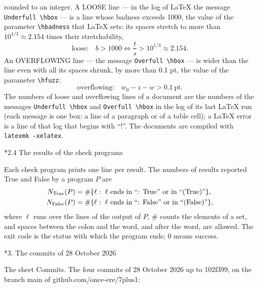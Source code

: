 \documentclass[10pt,a4paper]{article}
\makeatletter
\renewcommand\section{\@startsection{section}{1}{\z@}{-3.5ex \@plus -1ex \@minus -.2ex}{2.3ex \@plus.2ex}{\normalfont\Large\bfseries\raggedright}}
\renewcommand\subsection{\@startsection{subsection}{2}{\z@}{-3.25ex\@plus -1ex \@minus -.2ex}{1.5ex \@plus .2ex}{\normalfont\large\bfseries\raggedright}}
\makeatother
\begin{document}
rounded to an integer. A LOOSE line — in the log of LaTeX the message \texttt{Underfull \textbackslash{}\allowbreak{}hbox} — is a line whose badness exceeds 1000, the value of the parameter \texttt{\textbackslash{}\allowbreak{}hbadness} that LaTeX sets: its spaces stretch to more than $10^{1/3}\approx2.154$ times their stretchability,
\begin{equation*}
\text{loose:}\quad b>1000\iff\frac ts>10^{1/3}\approx2.154 .
\end{equation*}
An OVERFLOWING line — the message \texttt{Overfull \textbackslash{}\allowbreak{}hbox} — is wider than the line even with all its spaces shrunk, by more than 0.1 pt, the value of the parameter \texttt{\textbackslash{}\allowbreak{}hfuzz}:
\begin{equation*}
\text{overflowing:}\quad w_0-z-w>0.1\ \text{pt}.
\end{equation*}
The numbers of loose and overflowing lines of a document are the numbers of the messages \texttt{Underfull \textbackslash{}\allowbreak{}hbox} and \texttt{Overfull \textbackslash{}\allowbreak{}hbox} in the log of its last LaTeX run (each message is one box: a line of a paragraph or of a table cell); a LaTeX error is a line of that log that begins with “!”. The documents are compiled with \texttt{latexmk -xelatex}.

\subsection*{2.4 The results of the check programs}
Each check program prints one line per result. The numbers of results reported True and False by a program $P$ are
\begin{align*}
N_{\rm True}(P)&=\#\{\ell:\ \ell\text{ ends in “: True” or in “(True)”}\}, \\
N_{\rm False}(P)&=\#\{\ell:\ \ell\text{ ends in “: False” or in “(False)”}\},
\end{align*}
where $\ell$ runs over the lines of the output of $P$, $\#$ counts the elements of a set, and spaces between the colon and the word, and after the word, are allowed. The exit code is the status with which the program ends; 0 means success.

\section*{3. The commits of 28 October 2026}
The sheet Commits. The four commits of 28 October 2026 up to 102f399, on the branch main of github.com/once-ere/7plus1:
\end{document}
